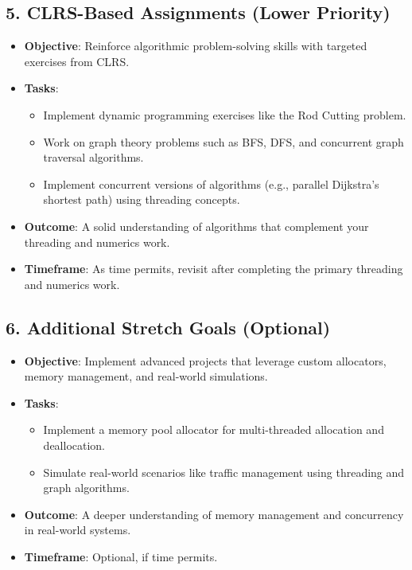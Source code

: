 \documentclass[a4paper,10pt]{article}
\begin{document}
\subsection*{5. CLRS-Based Assignments (Lower Priority)}
\begin{itemize}
    \item \textbf{Objective}: Reinforce algorithmic problem-solving skills with targeted exercises from CLRS.
    \item \textbf{Tasks}:
    \begin{itemize}
        \item Implement dynamic programming exercises like the Rod Cutting problem.
        \item Work on graph theory problems such as BFS, DFS, and concurrent graph traversal algorithms.
        \item Implement concurrent versions of algorithms (e.g., parallel Dijkstra's shortest path) using threading concepts.
    \end{itemize}
    \item \textbf{Outcome}: A solid understanding of algorithms that complement your threading and numerics work.
    \item \textbf{Timeframe}: As time permits, revisit after completing the primary threading and numerics work.
\end{itemize}

\subsection*{6. Additional Stretch Goals (Optional)}
\begin{itemize}
    \item \textbf{Objective}: Implement advanced projects that leverage custom allocators, memory management, and real-world simulations.
    \item \textbf{Tasks}:
    \begin{itemize}
        \item Implement a memory pool allocator for multi-threaded allocation and deallocation.
        \item Simulate real-world scenarios like traffic management using threading and graph algorithms.
    \end{itemize}
    \item \textbf{Outcome}: A deeper understanding of memory management and concurrency in real-world systems.
    \item \textbf{Timeframe}: Optional, if time permits.
\end{itemize}
\end{document}
